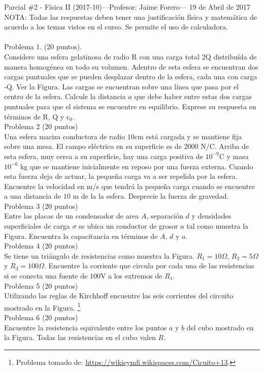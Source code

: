 \documentclass{article}
\begin{document}
\pagestyle{empty}
\noindent

\noindent
{\sc Parcial \#2  - Física II (2017-10)---Profesor: Jaime Forero--- 19
  de Abril de 2017}  
\\
NOTA: Todas las respuestas deben tener una justificaci\'on f\'isica y
matem\'atica de acuerdo a los temas vistos en el curso. Se permite el
uso de calculadora.\\
\\
Problema 1. (20 puntos).\\
Considere una esfera gelatinosa de radio R con una carga total 2Q 
distribu\'ida de manera homog\'enea en todo su volumen.
Adentro de esta esfera se encuentran dos cargas puntuales que se
pueden desplazar dentro de la esfera, cada una con carga -Q. Ver la
Figura.
Las cargas se encuentran sobre una l\'inea que pasa por el centro de la
esfera.
Calcule la  distancia $a$ que debe haber entre estas dos cargas
puntuales para que el sistema se encuentre en equilibrio.
Exprese su respuesta en t\'erminos de R, Q y $\epsilon_0$.\\
%
Problema 2 (20 puntos) \\
Una esfera maciza conductora de radio $10$cm est\'a cargada y se
mantiene fija sobre una mesa.
El campo el\'ectrico en su superficie es de $2000$ N/C.
Arriba de esta esfera, muy cerca a su superficie, hay una carga positiva de
$10^{-9}$C y masa $10^{-6}$ kg que se mantiene inicialmente en reposo
por una fuerza externa.
Cuando esta fuerza deja de actuar, la peque\~na carga va a ser
repelida por la esfera.
Encuentre la velocidad en m/s que tendr\'a la peque\~na carga cuando
se encuentre a una distancia de $10$ m de la la esfera. Desprecie la
fuerza de gravedad.\\ 
%
Problema 3 (20 puntos)\\
Entre las placas de un condensador de area $A$, separaci\'on $d$ y
densidades superficiales de carga $\sigma$ se ubica un conductor de
grosor $a$ tal como muestra la Figura. Encuentra la capacitancia en
t\'erminos de $A$, $d$ y $a$.\\
%
Problema 4 (20 puntos)\\
Se tiene un tri\'angulo de resistencias como muestra la
Figura. $R_1=10\Omega$, $R_2=5\Omega$ y $R_3=100\Omega$. Encuentre la
corriente que circula por cada una de las resistencias si se conecta
una fuente de $100$V a los extremos de $R_1$.\\
%
Problema 5 (20 puntos)\\
Utilizando las reglas de Kirchhoff encuentre las seis 
corrientes del circuito mostrado en la Figura.
\footnote{Problema tomado de: \url{https://wikieymfi.wikispaces.com/Cicuito+13}.}\\
%
Problema 6 (20 puntos)\\
Encuentre la resistencia equivalente entre los puntos $a$ y $b$
del cubo mostrado en la Figura. Todas
las resistencias en el cubo valen $R$.
  
\end{document}
